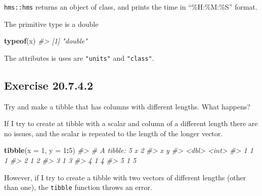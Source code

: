 \documentclass[]{book}
\newenvironment{Shaded}{\begin{snugshade}}{\end{snugshade}}
\newcommand{\CommentTok}[1]{\textcolor[rgb]{0.56,0.35,0.01}{\textit{#1}}}
\newcommand{\DataTypeTok}[1]{\textcolor[rgb]{0.13,0.29,0.53}{#1}}
\newcommand{\DecValTok}[1]{\textcolor[rgb]{0.00,0.00,0.81}{#1}}
\newcommand{\KeywordTok}[1]{\textcolor[rgb]{0.13,0.29,0.53}{\textbf{#1}}}
\newcommand{\NormalTok}[1]{#1}
\newcommand{\OperatorTok}[1]{\textcolor[rgb]{0.81,0.36,0.00}{\textbf{#1}}}
\theoremstyle{plain}
\theoremstyle{remark}
\begin{document}
\texttt{hms::hms} returns an object of class, and prints the time in ``\%H:\%M:\%S'' format.

The primitive type is a double

\begin{Shaded}
\begin{Highlighting}[]
\KeywordTok{typeof}\NormalTok{(x)}
\CommentTok{#> [1] "double"}
\end{Highlighting}
\end{Shaded}

The attributes is uses are \texttt{"units"} and \texttt{"class"}.

\begin{Shaded}
\end{Shaded}

\hypertarget{exercise-20.7.4.2}{%
\subsection*{\texorpdfstring{Exercise {20.7.4.2}}{Exercise 20.7.4.2}}\label{exercise-20.7.4.2}}

Try and make a tibble that has columns with different lengths. What happens?

If I try to create at tibble with a scalar and column of a different length there are no issues, and the scalar is repeated to the length of the longer vector.

\begin{Shaded}
\begin{Highlighting}[]
\KeywordTok{tibble}\NormalTok{(}\DataTypeTok{x =} \DecValTok{1}\NormalTok{, }\DataTypeTok{y =} \DecValTok{1}\OperatorTok{:}\DecValTok{5}\NormalTok{)}
\CommentTok{#> # A tibble: 5 x 2}
\CommentTok{#>       x     y}
\CommentTok{#>   <dbl> <int>}
\CommentTok{#> 1     1     1}
\CommentTok{#> 2     1     2}
\CommentTok{#> 3     1     3}
\CommentTok{#> 4     1     4}
\CommentTok{#> 5     1     5}
\end{Highlighting}
\end{Shaded}

However, if I try to create a tibble with two vectors of different lengths (other than one), the \texttt{tibble} function throws an error.
\end{document}
